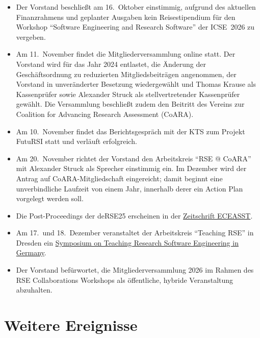 \begin{itemize}
\begin{itemize}
      F1000Research eingereicht und befindet sich in der öffentlichen Begutachtung.
    \item Der Vorstand beschließt am 16.~Oktober einstimmig, aufgrund des aktuellen Finanzrahmens und
      geplanter Ausgaben kein Reisestipendium für den Workshop "`Software Engineering and Research
      Software"' der ICSE~2026 zu vergeben.
    \item Am 11.~November findet die Mitgliederversammlung online statt. Der Vorstand wird für das Jahr
      2024 entlastet, die Änderung der Geschäftsordnung zu reduzierten Mitgliedsbeiträgen angenommen,
      der Vorstand in unveränderter Besetzung wiedergewählt und Thomas Krause als Kassenprüfer sowie
      Alexander Struck als stellvertretender Kassenprüfer gewählt. Die Versammlung beschließt zudem
      den Beitritt des Vereins zur Coalition for Advancing Research Assessment (CoARA).
    \item Am 10.~November findet das Berichtsgespräch mit der KTS zum Projekt FutuRSI statt und
      verläuft erfolgreich.
    \item Am 20.~November richtet der Vorstand den Arbeitskreis "`RSE @ CoARA"' mit Alexander Struck
      als Sprecher einstimmig ein. Im Dezember wird der Antrag auf CoARA-Mitgliedschaft eingereicht;
      damit beginnt eine unverbindliche Laufzeit von einem Jahr, innerhalb derer ein Action Plan
      vorgelegt werden soll.
    \item Die Post-Proceedings der deRSE25 erscheinen in der
      \href{https://eceasst.org/index.php/eceasst/issue/view/207}{Zeitschrift ECEASST}.
    \item Am 17.\ und 18.~Dezember veranstaltet der Arbeitskreis "`Teaching RSE"' in Dresden ein
      \href{https://the-teachingrse-project.github.io/teachingRSE-symposium/}{Symposium on Teaching
      Research Software Engineering in Germany}.
    \item Der Vorstand befürwortet, die Mitgliederversammlung 2026 im Rahmen des RSE Collaborations
      Workshops als öffentliche, hybride Veranstaltung abzuhalten.
   \end{itemize}
\end{itemize}
\clearpage
\section{Weitere Ereignisse}


